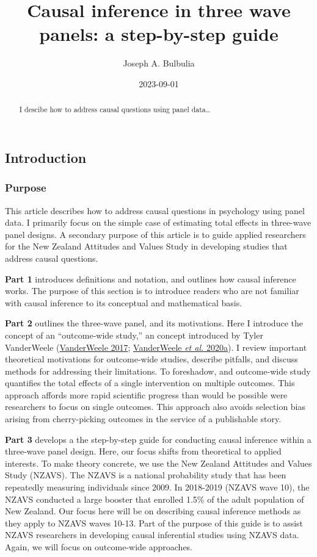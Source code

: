 \documentclass[
  singlecolumn]{article}
\title{Causal inference in three wave panels: a step-by-step guide}
\author{Joseph A. Bulbulia}
\affil{%
                  Victoria University of Wellington, New Zealand, School
                  of Psychology, Centre for Applied Cross-Cultural
                  Research
              }
\date{2023-09-01}
\begin{document}
\maketitle
\begin{abstract}
I descibe how to address causal questions using panel data\ldots{}
\end{abstract}
\subsection{Introduction}\label{introduction}

\subsubsection{Purpose}\label{purpose}

This article describes how to address causal questions in psychology
using panel data. I primarily focus on the simple case of estimating
total effects in three-wave panel designs. A secondary purpose of this
article is to guide applied researchers for the New Zealand Attitudes
and Values Study in developing studies that address causal questions.

\textbf{Part 1} introduces definitions and notation, and outlines how
causal inference works. The purpose of this section is to introduce
readers who are not familiar with causal inference to its conceptual and
mathematical basis.

\textbf{Part 2} outlines the three-wave panel, and its motivations. Here
I introduce the concept of an ``outcome-wide study,'' an concept
introduced by Tyler VanderWeele
(\hyperref[ref-vanderweele2017a]{VanderWeele 2017};
\hyperref[ref-vanderweele2020a]{VanderWeele \emph{et al.} 2020a}). I
review important theoretical motivations for outcome-wide studies,
describe pitfalls, and discuss methods for addressing their limitations.
To foreshadow, and outcome-wide study quantifies the total effects of a
single intervention on multiple outcomes. This approach affords more
rapid scientific progress than would be possible were researchers to
focus on single outcomes. This approach also avoids selection bias
arising from cherry-picking outcomes in the service of a publishable
story.

\textbf{Part 3} develops a the step-by-step guide for conducting causal
inference within a three-wave panel design. Here, our focus shifts from
theoretical to applied interests. To make theory concrete, we use the
New Zealand Attitudes and Values Study (NZAVS). The NZAVS is a national
probability study that has been repeatedly measuring individuals since
2009. In 2018-2019 (NZAVS wave 10), the NZAVS conducted a large booster
that enrolled 1.5\% of the adult population of New Zealand. Our focus
here will be on describing causal inference methods as they apply to
NZAVS waves 10-13. Part of the purpose of this guide is to assist NZAVS
researchers in developing causal inferential studies using NZAVS data.
Again, we will focus on outcome-wide approaches.
\end{document}
